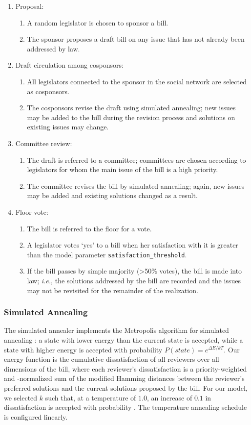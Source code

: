 \documentclass[pdftex,12pt]{llncs}
\begin{document}
\begin{enumerate}
\item Proposal:
\begin{enumerate}
\item A random legislator is chosen to sponsor a bill.
\item The sponsor proposes a draft bill on any issue that has not already been addressed by law.
\end{enumerate}
\item Draft circulation among cosponsors:
\begin{enumerate}
\item All legislators connected to the sponsor in the social network are selected as cosponsors.
\item The cosponsors revise the draft using simulated annealing; new issues may be added to the bill during the revision process and solutions on existing issues may change.
\end{enumerate}
\item Committee review:
\begin{enumerate}
\item The draft is referred to a committee; committees are chosen according to legislators for whom the main issue of the bill is a high priority.
\item The committee revises the bill by simulated annealing; again, new issues may be added and existing solutions changed as a result.
\end{enumerate}
\item Floor vote:
\begin{enumerate}
\item The bill is referred to the floor for a vote.
\item A legislator votes `yes' to a bill when her satisfaction with it is greater than the model parameter \texttt{satisfaction\_threshold}.
\item If the bill passes by simple majority (\textgreater 50\% votes), the bill is made into law; \textit{i.e.}, the solutions addressed by the bill are recorded and the issues may not be revisited for the remainder of the realization.
\end{enumerate}
\end{enumerate}

\subsubsection{Simulated Annealing}
The simulated annealer implements the Metropolis algorithm for simulated annealing \parencite{mrrt53, kgv}: a state with lower energy than the current state is accepted, while a state with higher energy is accepted with probability $P(state) = e^{\Delta E/kT}$.
Our energy function is the cumulative dissatisfaction of all reviewers over all dimensions of the bill, where each reviewer's dissatisfaction is a priority-weighted and -normalized sum of the modified Hamming distances between the reviewer's preferred solutions and the current solutions proposed by the bill. For our model, we selected $k$ such that, at a temperature of $1.0$, an increase of $0.1$ in dissatisfaction is accepted with probability . The temperature annealing schedule is configured linearly.
\end{document}
